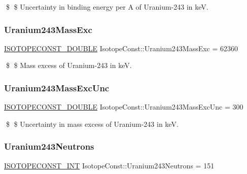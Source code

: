 \$ \$ Uncertainty in binding energy per A of Uranium-\/243 in keV. \mbox{\label{group___isotope_const-_uranium-_u243_ga0f4a6b79c15d1efcb96264b667cebbb3}} 
\subsubsection{\texorpdfstring{Uranium243\+Mass\+Exc}{Uranium243MassExc}}
{\footnotesize\ttfamily \mbox{\hyperlink{group___isotope_const-_macros_ga8f45a7272ce02c0b4c65c44636ed719a}{I\+S\+O\+T\+O\+P\+E\+C\+O\+N\+S\+T\+\_\+\+D\+O\+U\+B\+LE}} Isotope\+Const\+::\+Uranium243\+Mass\+Exc = 62360}

\$ \$ Mass excess of Uranium-\/243 in keV. \mbox{\label{group___isotope_const-_uranium-_u243_ga8325ce7374611211f2d57d87ca89a7fe}} 
\subsubsection{\texorpdfstring{Uranium243\+Mass\+Exc\+Unc}{Uranium243MassExcUnc}}
{\footnotesize\ttfamily \mbox{\hyperlink{group___isotope_const-_macros_ga8f45a7272ce02c0b4c65c44636ed719a}{I\+S\+O\+T\+O\+P\+E\+C\+O\+N\+S\+T\+\_\+\+D\+O\+U\+B\+LE}} Isotope\+Const\+::\+Uranium243\+Mass\+Exc\+Unc = 300}

\$ \$ Uncertainty in mass excess of Uranium-\/243 in keV. \mbox{\label{group___isotope_const-_uranium-_u243_ga5c62af5856e857fe1ade7d22e40b331f}} 
\subsubsection{\texorpdfstring{Uranium243\+Neutrons}{Uranium243Neutrons}}
{\footnotesize\ttfamily \mbox{\hyperlink{group___isotope_const-_macros_ga5f18360b3e99483a35c32d789e62621c}{I\+S\+O\+T\+O\+P\+E\+C\+O\+N\+S\+T\+\_\+\+I\+NT}} Isotope\+Const\+::\+Uranium243\+Neutrons = 151}

